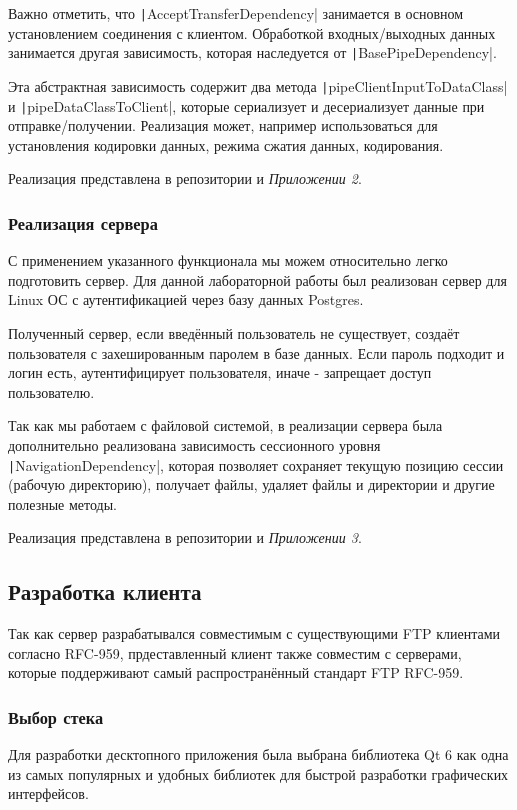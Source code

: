\documentclass[a4paper,14pt]{extarticle}
\begin{document}
Важно отметить, что \texttt|AcceptTransferDependency| занимается в основном установлением соединения с клиентом.
Обработкой входных/выходных данных занимается другая зависимость, которая наследуется от \texttt|BasePipeDependency|.

Эта абстрактная зависимость содержит два метода \texttt|pipeClientInputToDataClass| и \texttt|pipeDataClassToClient|, 
которые сериализует и десериализует данные при отправке/получении. Реализация может, например
использоваться для установления кодировки данных, режима сжатия данных, кодирования.

Реализация представлена в репозитории и \textit{Приложении 2}.

\subsubsection{Реализация сервера}
С применением указанного функционала мы можем относительно легко подготовить сервер. Для данной 
лабораторной работы был реализован сервер для Linux ОС с аутентификацией через базу данных 
Postgres.

Полученный сервер, если введённый пользователь не существует, создаёт пользователя с захешированным
паролем в базе данных. Если пароль подходит и логин есть, аутентифицирует пользователя, иначе - 
запрещает доступ пользователю.

Так как мы работаем с файловой системой, в реализации сервера была дополнительно
реализована зависимость сессионного уровня \texttt|NavigationDependency|, которая позволяет сохраняет
текущую позицию сессии (рабочую директорию), получает файлы, удаляет файлы и директории
и другие полезные методы. 

Реализация представлена в репозитории и \textit{Приложении 3}.

\subsection{Разработка клиента}
Так как сервер разрабатывался совместимым с существующими FTP клиентами согласно RFC-959, 
прдеставленный клиент также совместим с серверами, которые поддерживают самый 
распространённый стандарт FTP RFC-959. 

\subsubsection{Выбор стека}
Для разработки десктопного приложения была выбрана библиотека Qt 6 как одна из 
самых популярных и удобных библиотек для быстрой разработки графических интерфейсов. 
\end{document}
